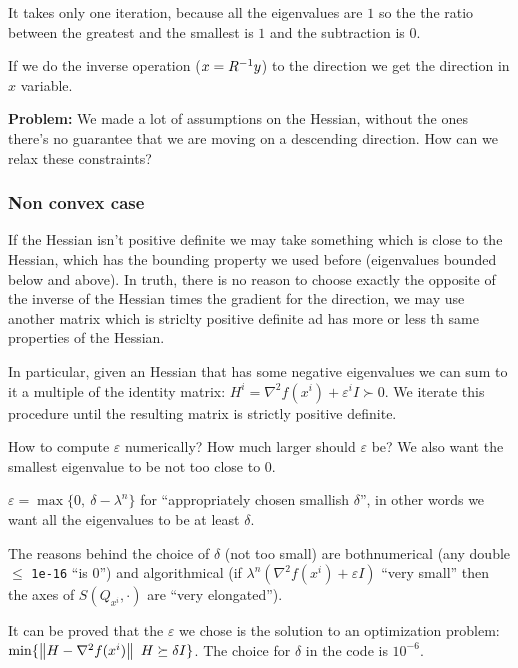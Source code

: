 \documentclass[ComputationalMathematics.tex]{subfiles}
\begin{document}
It takes only one iteration, because all the eigenvalues are $1$ so the the ratio between the greatest and the smallest is $1$ and the subtraction is $0$.

If we do the inverse operation ($x = {R}^{-1} y$) to the direction we get the direction in $x$ variable.

\begin{myframe}{\bf Problem:}
We made a lot of assumptions on the Hessian, without the ones there's no guarantee that we are moving on a descending direction. How can we relax these constraints?
\end{myframe}

\subsubsection{Non convex case}

If the Hessian isn't positive definite we may take something which is close to the Hessian, which has the bounding property we used before (eigenvalues bounded below and above). In truth, there is no reason to choose exactly the opposite of the inverse of the Hessian times the gradient for the direction, we may use another matrix which is striclty positive definite ad has more or less th same properties of the Hessian.

In particular, given an Hessian that has some negative eigenvalues we can sum to it a multiple of the identity matrix: $H^i = \nabla^2 f(x^i) + \varepsilon^i I \succ 0$. We iterate this procedure until the resulting matrix is strictly positive definite.

How to compute $\varepsilon$ numerically? How much larger should $\varepsilon$ be? We also want the smallest eigenvalue to be not too close to $0$.

 $\varepsilon = \max \{0,~  \delta - \lambda^n\}$ for ``appropriately chosen smallish $\delta$'', in other words we want all the eigenvalues to be at least $\delta$.

 The reasons behind the choice of $\delta$ (not too small) are bothnumerical (any double $\leq$ {\tt 1e-16} ``is $0$'') and algorithmical (if $\lambda^n(\nabla^2 f(x^i) + \varepsilon I)$ ``very small'' then the axes of $S(Q_{x^i}, \cdot)$ are ``very elongated'').

 It can be proved that the $\varepsilon$ we chose is the solution to an optimization problem: $\min \{\left\lVert H - \nabla^2 f(x^i)\right\rVert ~ H \succeq \delta I\}$. The choice for $\delta$ in the code is $10^{-6}$.
\end{document}
